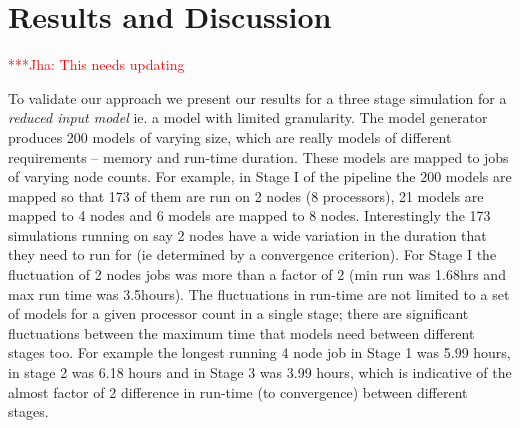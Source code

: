 \documentclass[conference,final]{IEEEtran}
\newcommand{\jha}[0]{}
\newcommand{\jhanote}[1]{ {\textcolor{red} { ***Jha: #1 }}}
\begin{document}
\section{Results and Discussion}

\jhanote{This needs updating}

To validate our approach we present our results for a three stage
simulation for a {\it reduced input model} ie. a model with limited
granularity. The model generator produces 200 models of varying size,
which are really models of different requirements -- memory and
run-time duration. These models are mapped to jobs of varying node
counts.  For example, in Stage I of the pipeline the 200 models are
mapped so that 173 of them are run on 2 nodes (8 processors), 21
models are mapped to 4 nodes and 6 models are mapped to 8 nodes.
Interestingly the 173 simulations running on say 2 nodes have a wide
variation in the duration that they need to run for (ie determined by
a convergence criterion). For Stage I the fluctuation of 2 nodes jobs
was more than a factor of 2 (min run was 1.68hrs and max run time was
3.5hours). The fluctuations in run-time are not limited to a set of
models for a given processor count in a single stage; there are
significant fluctuations between the maximum time that models need
between different stages too.  For example the longest running 4 node
job in Stage 1 was 5.99 hours, in stage 2 was 6.18 hours and in Stage
3 was 3.99 hours, which is indicative of the almost factor of 2
difference in run-time (to convergence) between different stages.

\end{document}
